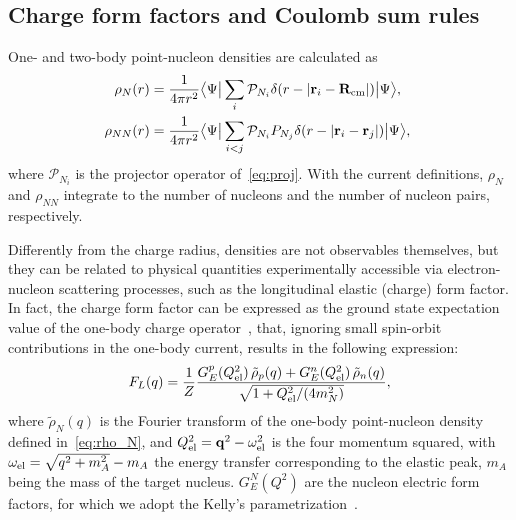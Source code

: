 \documentclass[aps,prc,twocolumn,superscriptaddress,floatfix]{revtex4-1}
\begin{document}
\subsection{Charge form factors and Coulomb sum rules}
One- and two-body point-nucleon densities are calculated as
\begin{align}
	\!\!\rho_{N}(r) &=\frac{1}{4\pi r^2}\big\langle\Psi\big|\sum_i    \mathcal P_{N_i}\delta(r-|\vb{r}_i-\vb{R}_{\rm cm}|)\big|\Psi\big\rangle, \label{eq:rho_N} \\
	\!\!\rho_{NN}(r)&=\frac{1}{4\pi r^2}\big\langle\Psi\big|\sum_{i<j}\mathcal P_{N_i}P_{N_j}\delta(r-|\vb{r}_i-\vb{r}_j|)\big|\Psi\big\rangle, \label{eq:rho_NN}
\end{align}
where $\mathcal P_{N_i}$ is the projector operator of~\cref{eq:proj}.
With the current definitions, $\rho_N$ and $\rho_{NN}$ integrate to the number 
of nucleons and the number of nucleon pairs, respectively.

Differently from the charge radius, densities are not observables themselves, 
but they can be related to physical quantities experimentally accessible via 
electron-nucleon scattering processes, such as the longitudinal elastic (charge) form factor.
In fact, the charge form factor can be expressed as the ground state expectation value of 
the one-body charge operator~\cite{Mcvoy:1962},
that, ignoring small spin-orbit contributions in the one-body current, 
results in the following expression:
\begin{align}
	F_L(q)=\frac{1}{Z}\frac{G_E^p(Q_{\rm el}^2)\,\tilde{\rho}_p(q)+G_E^n(Q_{\rm el}^2)\,\tilde{\rho}_n(q)}{\sqrt{1+Q_{\rm el}^2/(4 m_N^2)}},
	\label{eq:ff}
\end{align}
where $\tilde{\rho}_{N}(q)$ is the Fourier transform of the one-body point-nucleon density defined in~\cref{eq:rho_N}, 
and $Q^2_{\rm el}=\vb{q}^2-\omega_{\rm el}^2$ is the four momentum squared, 
with $\omega_{\rm el}=\sqrt{q^2+m_A^2}-m_A$ the energy transfer corresponding to the elastic peak,
$m_A$ being the mass of the target nucleus.
$G_E^N(Q^2)$ are the nucleon electric form factors, for which we adopt the Kelly's parametrization~\cite{Kelly:2004}.
\end{document}
